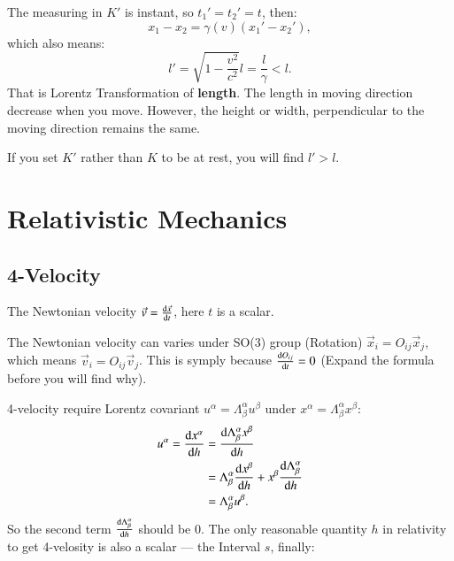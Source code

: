 \documentclass[openany,10pt]{book}
\theoremstyle{definition}
\theoremstyle{definition}
\theoremstyle{remark}
\begin{document}
The measuring in $K'$ is instant, so $t_1'=t_2'=t$, then:
\begin{equation}
x_1-x_2=\gamma(v)(x_1'-x_2'),
\end{equation}
which also means:
\begin{equation}
\boxed{l'=\sqrt{1-\frac{v^2}{c^2}}l=\frac{l}{\gamma}<l}.
\end{equation}
That is Lorentz Transformation of \textbf{length}. The length in moving direction decrease when you move. However, the height or width, perpendicular to the moving direction remains the same. 

If you set $K'$  rather than $K$ to be at rest, you will find $l'>l$.



\section{Relativistic Mechanics}
\subsection{4-Velocity}
The Newtonian velocity $\vec v=\frac{{\rm d}\vec x}{{\rm d}t}$, here $t$ is a scalar.

The Newtonian velocity can varies under SO(3) group (Rotation) $\vec x_i=O_{ij}\vec x_j$, which means  $\vec v_i=O_{ij}\vec v_j$. This is symply because $\frac{{\rm d}O_{ij}}{{\rm d}t}=0$ (Expand the formula before you will find why).

 4-velocity require Lorentz covariant $u^\alpha=\Lambda^\alpha_\beta u^\beta$ under $x^\alpha=\Lambda^\alpha_\beta x^\beta$:
\begin{equation}\begin{aligned}
u^\alpha=\frac{{\rm d}x^\alpha}{{\rm d}h}&=\frac{{\rm d}\Lambda^\alpha_\beta x^\beta}{{\rm d}h}\\
&=\Lambda^\alpha_\beta\frac{{\rm d} x^\beta}{{\rm d}h}+x^\beta \frac{{\rm d}\Lambda^\alpha_\beta }{{\rm d}h}\\
&=\Lambda^\alpha_\beta u^\beta.
\end{aligned}
\end{equation}
So the second term $\frac{{\rm d}\Lambda^\alpha_\beta }{{\rm d}h}$ should be 0.
The only reasonable quantity $h$ in relativity to get 4-velosity is also a scalar --- the Interval $s$, finally:
\end{document}
